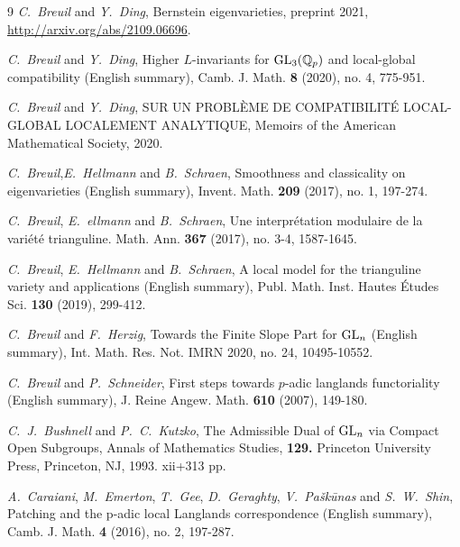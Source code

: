 \documentclass[SecEq,CM,GP]{degruyter-crelle} %
\theoremstyle{plain}
\newcommand{\GLN}{{\rm GL}}
\newcommand{\BQ}{{\mathbb{Q}}}
\begin{document}
\begin{thebibliography}{9}
\textit{C.~Breuil} and  \textit{Y.~Ding}, Bernstein eigenvarieties, 
preprint 2021, \url{http://arxiv.org/abs/2109.06696}.


\textit{C.~Breuil} and  \textit{Y.~Ding}, 
Higher $L$-invariants for $\GLN_3(\BQ_p)$ and local-global
	compatibility (English summary),
Camb. J. Math. \textbf{8} (2020), no. 4, 775-951.


\textit{C.~Breuil} and \textit{Y.~Ding},
SUR UN PROBL{\`E}ME DE COMPATIBILIT{\'E} LOCAL-GLOBAL LOCALEMENT ANALYTIQUE, 
 Memoirs of the American Mathematical Society, 2020.

\textit{C.~Breuil},\;\textit{E.~Hellmann} and \textit{B.~Schraen},
Smoothness and classicality on eigenvarieties (English summary),
Invent. Math. \textbf{209} (2017), no. 1, 197-274.


\textit{C.~Breuil}, \textit{E.~ellmann} and \textit{B.~Schraen},
Une interpr{\'e}tation modulaire de la vari{\'e}t{\'e} trianguline.
Math. Ann. \textbf{367} (2017), no. 3-4, 1587-1645.


\textit{C.~Breuil}, \textit{E.~Hellmann} and \textit{B.~Schraen},
 A local model for the trianguline variety and applications (English summary), 
 Publ. Math. Inst. Hautes \'{E}tudes Sci. \textbf{130} (2019), 299-412.


\textit{C.~Breuil} and \textit{F.~Herzig},
Towards the Finite Slope Part for $\GLN_n$ (English summary),
Int. Math. Res. Not. IMRN 2020, no. 24, 10495-10552.


\textit{C.~Breuil}  and \textit{P.~Schneider},
First steps towards $p$-adic langlands functoriality (English summary), 
J. Reine Angew. Math. \textbf{610} (2007), 149-180.



\textit{C.~J.~Bushnell} and  \textit{P.~C.~Kutzko},
The Admissible Dual of $\GLN_n$ via Compact Open Subgroups, 
Annals of Mathematics Studies, \textbf{129.} Princeton University Press, Princeton, NJ, 1993. xii+313 pp. 

\textit{A.~Caraiani}, \textit{M.~Emerton}, \textit{T.~Gee}, \textit{D.~Geraghty}, \textit{V.~Pa\v{s}k\={u}nas} and \textit{S.~W.~Shin},
Patching and the p-adic local Langlands correspondence (English summary),\;
Camb. J. Math. \textbf{4} (2016), no. 2, 197-287.



\end{thebibliography}
\end{document}
